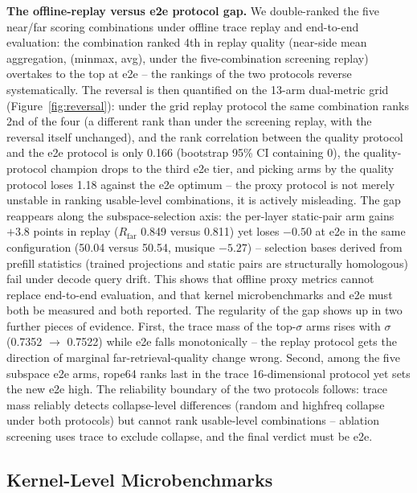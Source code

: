 \documentclass[11pt]{article}
\begin{document}
\textbf{The offline-replay versus e2e protocol gap.} We double-ranked the five near/far scoring combinations under offline trace replay and end-to-end evaluation: the combination ranked 4th in replay quality (near-side mean aggregation, (minmax, avg), under the five-combination screening replay) overtakes to the top at e2e -- the rankings of the two protocols reverse systematically. The reversal is then quantified on the 13-arm dual-metric grid (Figure~\ref{fig:reversal}): under the grid replay protocol the same combination ranks 2nd of the four (a different rank than under the screening replay, with the reversal itself unchanged), and the rank correlation between the quality protocol and the e2e protocol is only 0.166 (bootstrap 95\% CI containing 0), the quality-protocol champion drops to the third e2e tier, and picking arms by the quality protocol loses 1.18 against the e2e optimum -- the proxy protocol is not merely unstable in ranking usable-level combinations, it is actively misleading. The gap reappears along the subspace-selection axis: the per-layer static-pair arm gains $+3.8$ points in replay ($R_\mathrm{far}$ 0.849 versus 0.811) yet loses $-0.50$ at e2e in the same configuration (50.04 versus 50.54, musique $-5.27$) -- selection bases derived from prefill statistics (trained projections and static pairs are structurally homologous) fail under decode query drift. This shows that offline proxy metrics cannot replace end-to-end evaluation, and that kernel microbenchmarks and e2e must both be measured and both reported. The regularity of the gap shows up in two further pieces of evidence. First, the trace mass of the top-$\sigma$ arms rises with $\sigma$ (0.7352 $\rightarrow$ 0.7522) while e2e falls monotonically -- the replay protocol gets the direction of marginal far-retrieval-quality change wrong. Second, among the five subspace e2e arms, rope64 ranks last in the trace 16-dimensional protocol yet sets the new e2e high. The reliability boundary of the two protocols follows: trace mass reliably detects collapse-level differences (random and highfreq collapse under both protocols) but cannot rank usable-level combinations -- ablation screening uses trace to exclude collapse, and the final verdict must be e2e.

\subsection{Kernel-Level Microbenchmarks}
\end{document}
